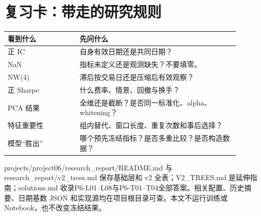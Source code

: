 \clearpage\section{复习卡：带走的研究规则}
\begin{center}\small
\begin{tabular}{p{0.28\linewidth}p{0.62\linewidth}}
\toprule
看到什么 & 先问什么\\
\midrule
正 IC & 自身有效日期还是共同日期？\\
NaN & 指标未定义还是观测缺失？不要填零。\\
NW(4) & 滞后按交易日还是压缩后有效观察？\\
正 Sharpe & 什么费率、情景、回撤与换手？\\
PCA 结果 & 全维还是截断？是否同一标准化、alpha、whitening？\\
特征重要性 & 组内替代、窗口长度、重复次数和事后选择？\\
模型“胜出” & 哪个预先冻结指标？是否多重比较？是否构造数据？\\
\bottomrule
\end{tabular}
\end{center}
projects/project06/research\_report/README.md 与 research\_report/v2\_trees.md 保存基础层和 v2 全表；V2\_TREES.md 是延伸指南；solutions.md 收录P6-L01–L08与P6-T01–T04全部答案。相关配置、历史摘要、日期基数 JSON 和实现源均在项目根目录可查。本文不运行训练或 Notebook，也不改变冻结结果。



